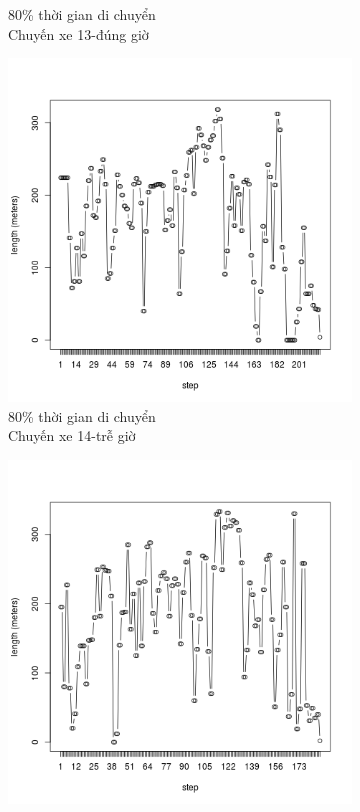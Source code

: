 \documentclass[a4paper, 13pt]{report}
\begin{document}
\begin{figure}
\begin{subfigure}[b]{0.25\textwidth}
                \caption*{80\% thời gian di chuyển\\Chuyến xe 13-đúng giờ}
        \end{subfigure}%
        \begin{subfigure}[b]{0.25\textwidth}
                \includegraphics[width=\linewidth]{test14}
                \caption*{80\% thời gian di chuyển\\Chuyến xe 14-trễ giờ}
        \end{subfigure}%
        \begin{subfigure}[b]{0.25\textwidth}
                \includegraphics[width=\linewidth]{test15}

\end{subfigure}
\end{figure}
\end{document}
